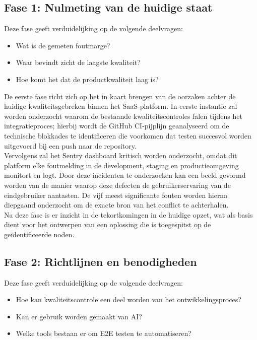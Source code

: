 \subsection{Fase 1:  Nulmeting van de huidige staat}
Deze fase geeft verduidelijking op de volgende deelvragen:
\begin{itemize}
    \item Wat is de gemeten foutmarge?
    \item Waar bevindt zicht de laagste kwaliteit?
    \item Hoe komt het dat de productkwaliteit laag is?
\end{itemize}

De eerste fase richt zich op het in kaart brengen van de oorzaken achter de huidige kwaliteitsgebreken binnen het SaaS-platform. In eerste instantie zal worden onderzocht waarom de bestaande kwaliteitscontroles falen tijdens het integratieproces; hierbij wordt de GitHub CI-pijplijn geanalyseerd om de technische blokkades te identificeren die voorkomen dat testen succesvol worden uitgevoerd bij een push naar de repository.
\bigskip
\\
Vervolgens zal het Sentry dashboard kritisch worden onderzocht, omdat dit platform elke foutmelding in de development, staging en productieomgeving monitort en logt. Door deze incidenten te onderzoeken kan een beeld gevormd worden van de manier waarop deze defecten de gebruikerservaring van de eindgebruiker aantasten. De vijf meest significante fouten worden hierna diepgaand onderzocht om de exacte bron van het conflict te achterhalen.
\bigskip
\\
Na deze fase is er inzicht in de tekortkomingen in de huidige opzet, wat als basis dient voor het ontwerpen van een oplossing die is toegespitst op de geïdentificeerde noden.

\subsection{Fase 2: Richtlijnen en benodigheden}
Deze fase geeft verduidelijking op de volgende deelvragen:
\begin{itemize}
    \item Hoe kan kwaliteitscontrole een deel worden van het ontwikkelingsproces?
    \item Kan er gebruik worden gemaakt van AI?
    \item Welke tools bestaan er om E2E testen te automatiseren?
\end{itemize}

